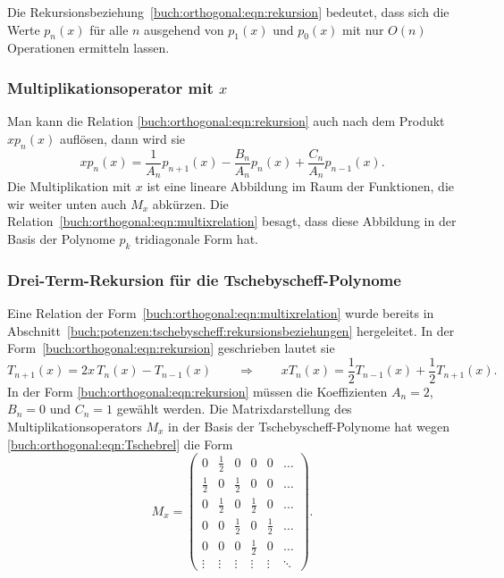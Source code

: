 Die Rekursionsbeziehung~\eqref{buch:orthogonal:eqn:rekursion} bedeutet,
dass sich die Werte $p_n(x)$ für alle $n$ ausgehend von $p_1(x)$ und
$p_0(x)$ mit nur $O(n)$ Operationen ermitteln lassen.

%
%
\subsubsection{Multiplikationsoperator mit $x$}
%
Man kann die Relation \eqref{buch:orthogonal:eqn:rekursion}
auch nach dem Produkt $xp_n(x)$ auflösen, dann wird sie
\begin{equation}
xp_n(x)
=
\frac{1}{A_n}p_{n+1}(x)
-
\frac{B_n}{A_n}p_n(x)
+
\frac{C_n}{A_n}p_{n-1}(x).
\label{buch:orthogonal:eqn:multixrelation}
\end{equation}
Die Multiplikation mit $x$ ist eine lineare Abbildung im Raum der Funktionen,
die wir weiter unten auch $M_x$ abkürzen.
Die Relation~\eqref{buch:orthogonal:eqn:multixrelation} besagt, dass diese
Abbildung in der Basis der Polynome $p_k$ tridiagonale Form hat.

%
%
\subsubsection{Drei-Term-Rekursion für die Tschebyscheff-Polynome}
Eine Relation der Form~\eqref{buch:orthogonal:eqn:multixrelation}
wurde bereits in 
Abschnitt~\ref{buch:potenzen:tschebyscheff:rekursionsbeziehungen}
hergeleitet.
In der Form~\eqref{buch:orthogonal:eqn:rekursion} geschrieben lautet
sie
\begin{equation}
T_{n+1}(x) = 2x\,T_n(x)-T_{n-1}(x)
\qquad\Rightarrow\qquad
xT_n(x) = \frac12 T_{n-1}(x) + \frac12 T_{n+1}(x).
\label{buch:orthogonal:eqn:Tschebrel}
\end{equation}
In der Form
\eqref{buch:orthogonal:eqn:rekursion}
müssen die Koeffizienten
$A_n=2$, $B_n=0$ und $C_n=1$ gewählt werden.
Die Matrixdarstellung des Multiplikationsoperators $M_x$ in der
Basis der Tschebyscheff-Polynome hat wegen
\eqref{buch:orthogonal:eqn:Tschebrel}
die Form
\begin{equation}
M_x
=
\begin{pmatrix}
      0&\frac12&      0&      0&      0&\dots  \\
\frac12&      0&\frac12&      0&      0&\dots  \\
      0&\frac12&      0&\frac12&      0&\dots  \\
      0&      0&\frac12&      0&\frac12&\dots  \\
      0&      0&      0&\frac12&      0&\dots  \\
 \vdots& \vdots& \vdots& \vdots& \vdots&\ddots 
\end{pmatrix}.
\label{buch:orthogonal:eqn:Mx}
\end{equation}

